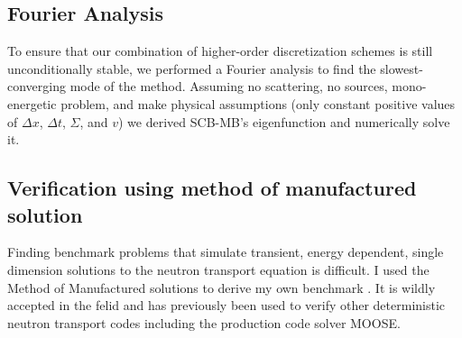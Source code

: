 \subsection{Fourier Analysis}

To ensure that our combination of higher-order discretization schemes is still unconditionally stable, we performed a Fourier analysis to find the slowest-converging mode of the method.
Assuming no scattering, no sources, mono-energetic problem, and make physical assumptions (only constant positive values of $\Delta x$, $\Delta t$, $\Sigma$, and $v$) we derived SCB-MB's eigenfunction and numerically solve it. 

\subsection{Verification using method of manufactured solution}

Finding benchmark problems that simulate transient, energy dependent, single dimension solutions to the neutron transport equation is difficult.
I used the Method of Manufactured solutions to derive my own benchmark .
It is wildly accepted in the felid  and has previously been used to verify other deterministic neutron transport codes including the production code solver MOOSE.
  
